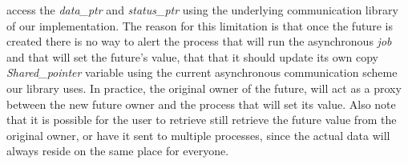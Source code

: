 access the \emph{data\_ptr} and \emph{status\_ptr} using the underlying communication library of our implementation.
The reason for this limitation is that once the future is created there is no way to alert the process that will
run the asynchronous \emph{job} and that will set the future's value, that that it should update its own copy \emph{Shared\_pointer}
variable using the current asynchronous communication scheme our library uses.  In practice, the original owner of the
future, will act as a proxy between the new future owner and the process that will set its value.  Also note that it is
possible for the user to retrieve still retrieve the future value from the original owner, or have it sent to multiple
processes, since the actual data will always reside on the same place for everyone.

